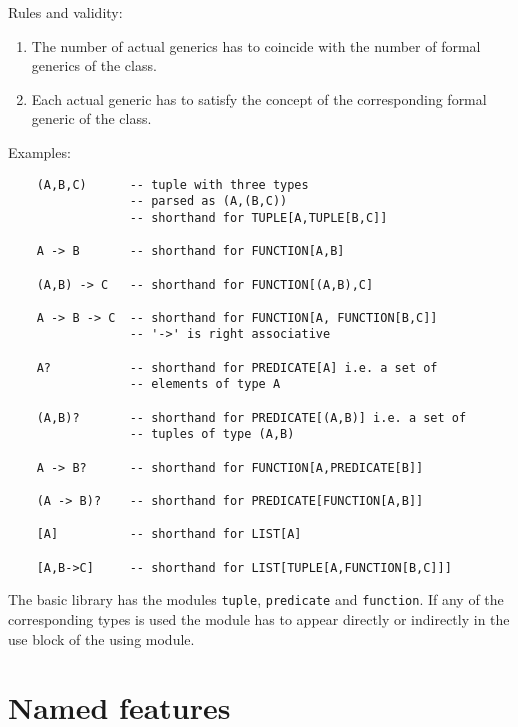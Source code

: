 \noindent Rules and validity:
\begin{enumerate}
\item The number of actual generics has to coincide with the number of formal
  generics of the class.

\item Each actual generic has to satisfy the concept of the corresponding
  formal generic of the class.
\end{enumerate}

\noindent Examples:
%
\begin{lstlisting}
    (A,B,C)      -- tuple with three types
                 -- parsed as (A,(B,C))
                 -- shorthand for TUPLE[A,TUPLE[B,C]]

    A -> B       -- shorthand for FUNCTION[A,B]

    (A,B) -> C   -- shorthand for FUNCTION[(A,B),C]

    A -> B -> C  -- shorthand for FUNCTION[A, FUNCTION[B,C]]
                 -- '->' is right associative

    A?           -- shorthand for PREDICATE[A] i.e. a set of
                 -- elements of type A

    (A,B)?       -- shorthand for PREDICATE[(A,B)] i.e. a set of
                 -- tuples of type (A,B)

    A -> B?      -- shorthand for FUNCTION[A,PREDICATE[B]]

    (A -> B)?    -- shorthand for PREDICATE[FUNCTION[A,B]]

    [A]          -- shorthand for LIST[A]

    [A,B->C]     -- shorthand for LIST[TUPLE[A,FUNCTION[B,C]]]
\end{lstlisting}

The basic library has the modules \lstinline!tuple!, \lstinline!predicate! and
\lstinline!function!. If any of the corresponding types is used the module has
to appear directly or indirectly in the use block of the using module.



\section{Named features}

